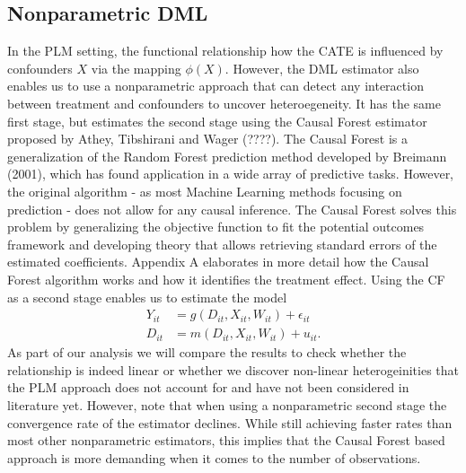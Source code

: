 \subsection{Nonparametric DML} \label{sec:NP-DML}
In the PLM setting, the functional relationship how the CATE is influenced by confounders $X$ via the mapping $\phi(X)$. However, the DML estimator also enables us to use a nonparametric approach that can detect any interaction between treatment and confounders to uncover heteroegeneity. It has the same first stage, but estimates the second stage using the Causal Forest estimator proposed by Athey, Tibshirani and Wager (????). The Causal Forest is a generalization of the Random Forest prediction method developed by Breimann (2001), which has found application in a wide array of predictive tasks. However, the original algorithm - as most Machine Learning methods focusing on prediction - does not allow for any causal inference. The Causal Forest solves this problem by generalizing the objective function to fit the potential outcomes framework and developing theory that allows retrieving standard errors of the estimated coefficients. Appendix A elaborates in more detail how the Causal Forest algorithm works and how it identifies the treatment effect. Using the CF as a second stage enables us to estimate the model 
\begin{align*}
    Y_{it}&=g(D_{it}, X_{it}, W_{it})+\epsilon_{it} \\ 
    D_{it}&=m(D_{it}, X_{it}, W_{it})+u_{it}.
\end{align*}
As part of our analysis we will compare the results to check whether the relationship is indeed linear or whether we discover non-linear heterogeinities that the PLM approach does not account for and have not been considered in literature yet. However, note that when using a nonparametric second stage the convergence rate of the estimator declines. While still achieving faster rates than most other nonparametric estimators, this implies that the Causal Forest based approach is more demanding when it comes to the number of observations. 